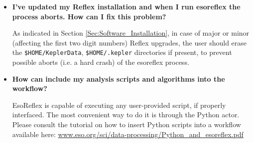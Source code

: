 \begin{itemize}
\item {\bf I've updated my Reflex installation and when I run esoreflex the process aborts. How can I fix this problem?}
  
  As indicated in Section \ref{Sec:Software_Installation}, in case of major or
  minor (affecting the first two digit numbers) Reflex upgrades, the user
  should erase the
 \verb+$HOME/KeplerData+, \verb+$HOME/.kepler+ directories if present,
 to prevent possible aborts (i.e. a hard crash) of the esoreflex process.

\item {\bf How can include my analysis scripts and algorithms into the 
workflow?}

EsoReflex is capable of executing any user-provided script, if
properly interfaced. The most convenient way to do it is through
the Python actor. Please consult the tutorial on how to
insert Python scripts into a workflow available here:
\url{www.eso.org/sci/data-processing/Python_and_esoreflex.pdf}

\end{itemize}
